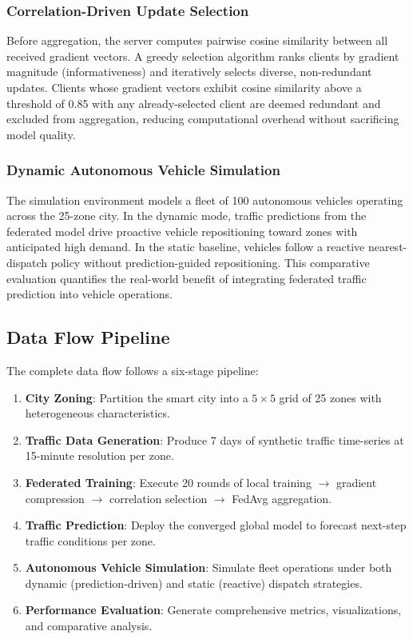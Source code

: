 \documentclass[journal]{IEEEtran}
\begin{document}
\subsubsection{Correlation-Driven Update Selection}
Before aggregation, the server computes pairwise cosine similarity between all received gradient vectors. A greedy selection algorithm ranks clients by gradient magnitude (informativeness) and iteratively selects diverse, non-redundant updates. Clients whose gradient vectors exhibit cosine similarity above a threshold of 0.85 with any already-selected client are deemed redundant and excluded from aggregation, reducing computational overhead without sacrificing model quality.

\subsubsection{Dynamic Autonomous Vehicle Simulation}
The simulation environment models a fleet of 100 autonomous vehicles operating across the 25-zone city. In the dynamic mode, traffic predictions from the federated model drive proactive vehicle repositioning toward zones with anticipated high demand. In the static baseline, vehicles follow a reactive nearest-dispatch policy without prediction-guided repositioning. This comparative evaluation quantifies the real-world benefit of integrating federated traffic prediction into vehicle operations.

\subsection{Data Flow Pipeline}
The complete data flow follows a six-stage pipeline:
\begin{enumerate}
    \item \textbf{City Zoning}: Partition the smart city into a $5 \times 5$ grid of 25 zones with heterogeneous characteristics.
    \item \textbf{Traffic Data Generation}: Produce 7 days of synthetic traffic time-series at 15-minute resolution per zone.
    \item \textbf{Federated Training}: Execute 20 rounds of local training $\rightarrow$ gradient compression $\rightarrow$ correlation selection $\rightarrow$ FedAvg aggregation.
    \item \textbf{Traffic Prediction}: Deploy the converged global model to forecast next-step traffic conditions per zone.
    \item \textbf{Autonomous Vehicle Simulation}: Simulate fleet operations under both dynamic (prediction-driven) and static (reactive) dispatch strategies.
    \item \textbf{Performance Evaluation}: Generate comprehensive metrics, visualizations, and comparative analysis.
\end{enumerate}
\end{document}
